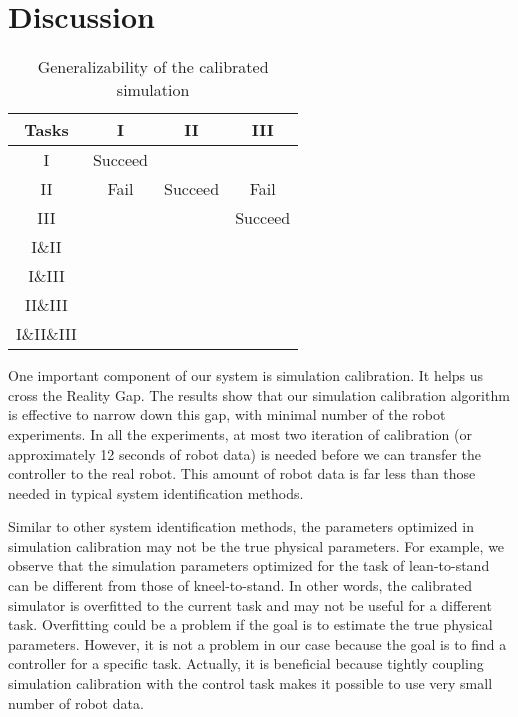 \section{Discussion}
\begin{table}
\caption{Generalizability of the calibrated simulation}
 \label{table:generalize}
\begin{center}
\begin{tabular}{|c|c|c|c|}
\hline
 Tasks &  I &  II  &  III \\
 \hline
 I & Succeed & &  \\
 II & Fail & Succeed & Fail \\
 III & & & Succeed \\
 I\&II & & & \\
 I\&III & & & \\
 II\&III & & & \\
 I\&II\&III & & &\\
\hline
\end{tabular}
\end{center}
 \end{table}


One important component of our system is simulation calibration. It helps us cross the Reality Gap. The results show that our simulation calibration algorithm is effective to narrow down this gap, with minimal number of the robot experiments. In all the experiments, at most two iteration of calibration (or approximately 12 seconds of robot data) is needed before we can transfer the controller to the real robot. This amount of robot data is far less than those needed in typical system identification methods.

Similar to other system identification methods, the parameters optimized in simulation calibration may not be the true physical parameters. For example, we observe that the simulation parameters optimized for the task of lean-to-stand can be different from those of kneel-to-stand. In other words, the calibrated simulator is overfitted to the current task and may not be useful for a different task. Overfitting could be a problem if the goal is to estimate the true physical parameters. However, it is not a problem in our case because the goal is to find a controller for a specific task. Actually, it is beneficial because tightly coupling simulation calibration with the control task makes it possible to use very small number of robot data.

